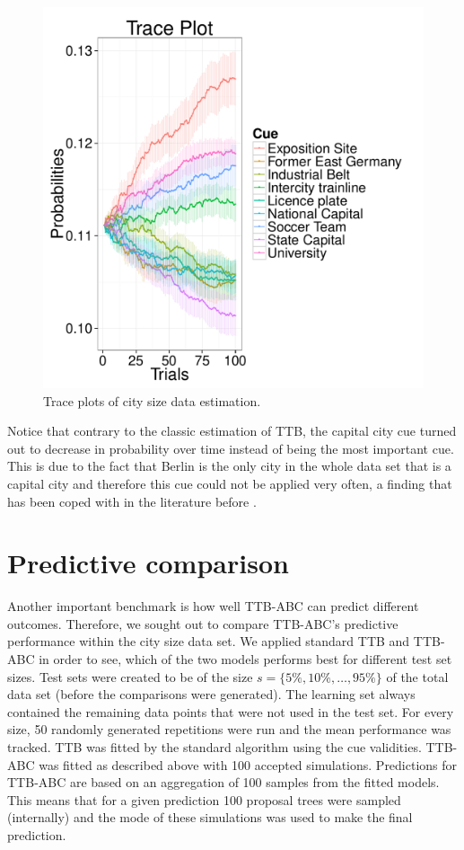 \documentclass[a4paper,man, natbib]{apa6}
\begin{document}
\begin{figure}[htb!]
  \caption{Trace plots of city size data estimation.}
\label{fig:citytrace}
  \centering
    \includegraphics[scale=0.5]{figs/citytrace.pdf}
\end{figure}

Notice that contrary to the classic estimation of TTB, the capital city cue turned out to decrease in probability over time instead of being the most important cue. This is due to the fact that Berlin is the only city in the whole data set that is a capital city and therefore this cue could not be applied very often, a finding that has been coped with in the literature before \citep{broder2012quest}.

\section{Predictive comparison}
Another important benchmark is how well TTB-ABC can predict different outcomes. Therefore, we sought out to compare TTB-ABC's predictive performance within the city size data set. We applied standard TTB and  TTB-ABC in order to see, which of the two models performs best for different test set sizes. Test sets were created to be of the size $s=\{5\%,10\%,\dots,95\%\}$ of the total data set (before the comparisons were generated). The learning set always contained the remaining data points that were not used in the test set. For every size, 50 randomly generated repetitions were run and the mean performance was tracked. TTB was fitted by the standard algorithm using the cue validities. TTB-ABC was fitted as described above with 100 accepted simulations. Predictions for TTB-ABC are based on an aggregation of 100 samples from the fitted models. This means that for a given prediction 100 proposal trees were sampled (internally) and the mode of these simulations was used to make the final prediction. 
\end{document}
